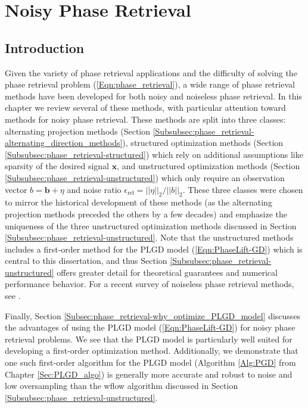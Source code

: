 \chapter{Noisy Phase Retrieval} 	\label{Sec:phase_retrieval}




\section{Introduction}  	\label{Subsec:phase_retrieval-intro}


Given the variety of phase retrieval applications and the difficulty of solving the phase retrieval problem (\ref{Eqn:phase_retrieval}), a wide range of phase retrieval methods have been developed for both noisy and noiseless phase retrieval. 
In this chapter we review several of these methods, with particular attention toward methods for noisy phase retrieval.  
These methods are split into three classes: alternating projection methods (Section \ref{Subsubsec:phase_retrieval-alternating_direction_methods}), structured optimization methods (Section \ref{Subsubsec:phase_retrieval-structured}) which rely on additional assumptions like sparsity of the desired signal $\mathbf{x}$, and unstructured optimization methods (Section \ref{Subsubsec:phase_retrieval-unstructured}) which only require an observation vector $b = \mathbf{b} + \eta$ and noise ratio $\epsilon_{\text{rel}} = ||\eta||_2 / ||b||_2$.  
These three classes were chosen to mirror the historical development of these methods (as the alternating projection methods preceded the others by a few decades) and emphasize the uniqueness of the three unstructured optimization methods discussed in Section \ref{Subsubsec:phase_retrieval-unstructured}.
Note that the unstructured methods includes a first-order method for the PLGD model (\ref{Eqn:PhaseLift-GD}) which is central to this dissertation, and thus Section \ref{Subsubsec:phase_retrieval-unstructured} offers greater detail for theoretical guarantees and numerical performance behavior.
For a recent survey of noiseless phase retrieval methods, see \cite{DBLP:journals/corr/JaganathanEH15a}.

Finally, Section \ref{Subsec:phase_retrieval-why_optimize_PLGD_model} discusses the advantages of using the PLGD model (\ref{Eqn:PhaseLift-GD}) for noisy phase retrieval problems.
We see that the PLGD model is particularly well suited for developing a first-order optimization method.
Additionally, we demonstrate that one such first-order algorithm for the PLGD model (Algorithm \ref{Alg:PGD} from Chapter \ref{Sec:PLGD_algo}) is generally more accurate and robust to noise and low oversampling than the wflow algorithm discussed in Section \ref{Subsubsec:phase_retrieval-unstructured}.













